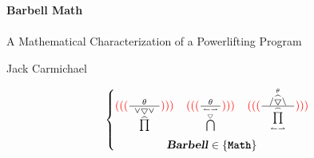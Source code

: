 \documentclass[footheight=20pt, footsepline, headheight=20pt, headsepline]{book}
\begin{document}

\begingroup
\thispagestyle{empty}
\centering
\vspace*{8cm}
\par\normalfont\fontsize{35}{35}\sffamily\selectfont
\textbf{Barbell Math}\\
\\
{\large A Mathematical Characterization of a Powerlifting Program}\par %
\vspace*{1cm}
{\Huge Jack Carmichael}\par %
\endgroup

\begin{figure*}[b]
\begin{equation*}
	\left\{\begin{matrix}
		{\color{red}(((}
		\frac{
			\;\;\;\;\;
			\theta
			\;\;\;\;\;
		}{
			\underset{
				\widehat{\prod}
			}{
				\vee\bigtriangledown\vee
			}
		}
		{\color{red})))}
		
		\;\;\;\;
		
		{\color{red}(((}
		\frac{
			\;\;\;
			\theta
			\;\;\;
		}{
			\bigcap 
			\limits^{
				\overset{\leftharpoonup \rightharpoonup }
				{\bigtriangledown_{}}}_{}  
		}
		{\color{red})))}
		
		\;\;\;\;

		{\color{red} (((}
		\frac{
			\;\;\; 
			/\overset{\theta}{\widehat{\bigtriangledown}} \setminus  
			\;\;\;
		}{
			{\prod\limits_{\leftharpoonup \rightharpoonup}^{\frown} }
		}
		{\color{red})))}
	 	\\
	 	\textbf{\textsl{Barbell}} \in \{ \texttt{\textbf{Math}} \}
	\end{matrix}\right.
\end{equation*}
\end{figure*}
\end{document}
